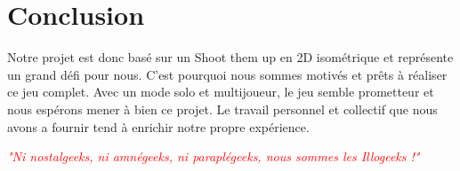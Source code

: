 \documentclass{article}
\begin{document}
\newpage
\section{Conclusion}

\par
Notre projet est donc basé sur un Shoot them up en 2D isométrique et représente un grand défi pour nous. C'est pourquoi nous sommes motivés et prêts à réaliser ce jeu complet. Avec un mode solo et multijoueur, le jeu semble prometteur et nous espérons mener à bien ce projet. Le travail personnel et collectif que nous avons a fournir tend à enrichir notre propre expérience. 

\vspace*{6cm}

\par
\begin{center}
\textcolor{red}{\emph{"Ni nostalgeeks, ni amnégeeks, ni paraplégeeks, nous sommes les Illogeeks !"}}
\end{center}
\end{document}
